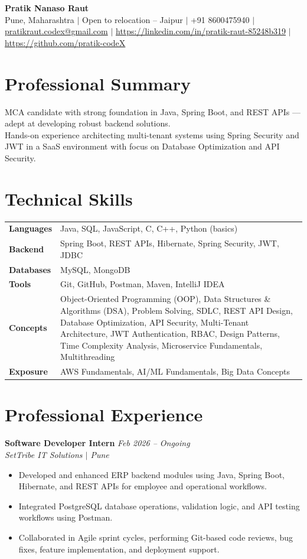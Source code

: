 \documentclass[10.5pt,a4paper]{article}
\begin{document}
\begin{center}
{\Large\bfseries Pratik Nanaso Raut}\\[2pt]
Pune, Maharashtra $|$ Open to relocation -- Jaipur $|$ +91 8600475940 $|$ \href{mailto:pratikraut.codex@gmail.com}{pratikraut.codex@gmail.com} $|$ \href{https://linkedin.com/in/pratik-raut-85248b319}{https://linkedin.com/in/pratik-raut-85248b319} $|$ \href{https://github.com/pratik-codeX}{https://github.com/pratik-codeX}
\end{center}
\vspace{-2pt}
\section{Professional Summary}
MCA candidate with strong foundation in Java, Spring Boot, and REST APIs — adept at developing robust backend solutions.\\[2pt]
Hands-on experience architecting multi-tenant systems using Spring Security and JWT in a SaaS environment with focus on Database Optimization and API Security.
\section{Technical Skills}
\begin{tabular}{@{}p{}p{}@{}}
\textbf{Languages} & Java, SQL, JavaScript, C, C++, Python (basics) \\[1pt]
\textbf{Backend} & Spring Boot, REST APIs, Hibernate, Spring Security, JWT, JDBC \\[1pt]
\textbf{Databases} & MySQL, MongoDB \\[1pt]
\textbf{Tools} & Git, GitHub, Postman, Maven, IntelliJ IDEA \\[1pt]
\textbf{Concepts} & Object-Oriented Programming (OOP), Data Structures \& Algorithms (DSA), Problem Solving, SDLC, REST API Design, Database Optimization, API Security, Multi-Tenant Architecture, JWT Authentication, RBAC, Design Patterns, Time Complexity Analysis, Microservice Fundamentals, Multithreading \\[1pt]
\textbf{Exposure} & AWS Fundamentals, AI/ML Fundamentals, Big Data Concepts \\
\end{tabular}
\section{Professional Experience}
\textbf{Software Developer Intern} \hfill \textit{Feb 2026 -- Ongoing}
\\\textit{SetTribe IT Solutions $|$ Pune}
\begin{itemize}
  \item Developed and enhanced ERP backend modules using Java, Spring Boot, Hibernate, and REST APIs for employee and operational workflows.
  \item Integrated PostgreSQL database operations, validation logic, and API testing workflows using Postman.
  \item Collaborated in Agile sprint cycles, performing Git-based code reviews, bug fixes, feature implementation, and deployment support.
\end{itemize}
\end{document}
